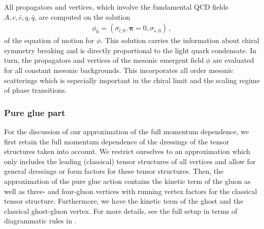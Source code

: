 \documentclass[aps,twocolumn,prd,superscriptaddress]{revtex4-2}
\begin{document}
All propagators and vertices, which involve the fundamental QCD fields $A,c,\bar c,q,\bar q$, are computed on the solution 
%
\begin{align}
\phi_0=(\sigma_{l,0},\boldsymbol{\pi}=0, \sigma_{s,0})\,,
 \label{eq:phi0sigma0}
 \end{align}
 of the equation of motion for $\phi$. 
This solution carries the information about chiral symmetry breaking and is directly proportional to the light quark condensate. In turn, the propagators and vertices of the mesonic emergent field $\phi$ are evaluated for all constant mesonic backgrounds. This incorporates all order mesonic scatterings which is especially important in the chiral limit and the scaling regime of phase transitions. 


\subsubsection{Pure glue part} 
\label{sec:PureGlue}

For the discussion of our approximation of the full momentum dependence, we first retain the full momentum dependence of the dressings of the tensor structures taken into account. We restrict ourselves to an approximation which only includes the leading (classical) tensor structures of all vertices and allow for general dressings or form factors for these tensor structures. Then, the approximation of the pure glue action contains the kinetic term of the gluon as well as three- and four-gluon vertices with running vertex factors for the classical tensor structure. Furthermore, we have the kinetic term of the ghost and the classical ghost-gluon vertex.
For more details, see the full setup in terms of diagrammatic rules in .
\end{document}
